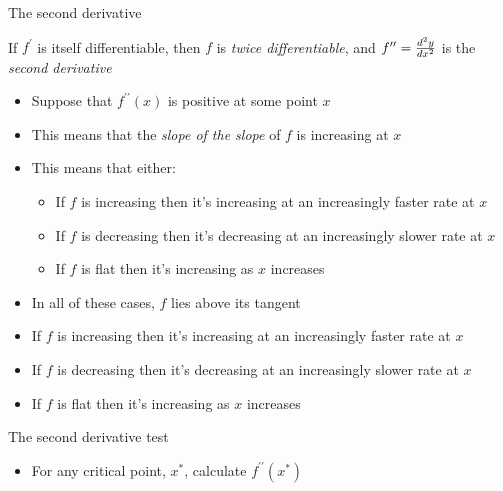 \documentclass[10pt]{seminar}
\begin{document}
\begin{slide}
\newslide

The second derivative

If $f^\prime$ is itself differentiable, then $f$ is \textit{twice differentiable}, and $f^{\prime\prime} = {{d^2y}\over{dx^2}}$ is the \textit{second derivative}

\begin{itemize}
\item Suppose that $f^{\prime\prime}(x)$ is positive at some point $x$
\item This means that the \textit{slope of the slope} of $f$ is increasing at $x$
\item This means that either:

\begin{itemize}

\item If $f$ is increasing then it's increasing at an increasingly faster rate at $x$
\item If $f$ is decreasing then it's decreasing at an increasingly slower rate at $x$
\item If $f$ is flat then it's increasing as $x$ increases

\end{itemize}
\item In all of these cases, $f$ lies above its tangent
\end{itemize}

\newslide

\begin{itemize}

\item[A] If $f$ is increasing then it's increasing at an increasingly faster rate at $x$
\item[B] If $f$ is decreasing then it's decreasing at an increasingly slower rate at $x$
\item[C] If $f$ is flat then it's increasing as $x$ increases

\end{itemize}

\vspace{.2in}
\begin{center}
\end{center}

\newslide

The second derivative test

\begin{itemize}
\item For any critical point, $x^*$, calculate $f^{\prime\prime}(x^*)$


\end{itemize}
\end{slide}
\end{document}
